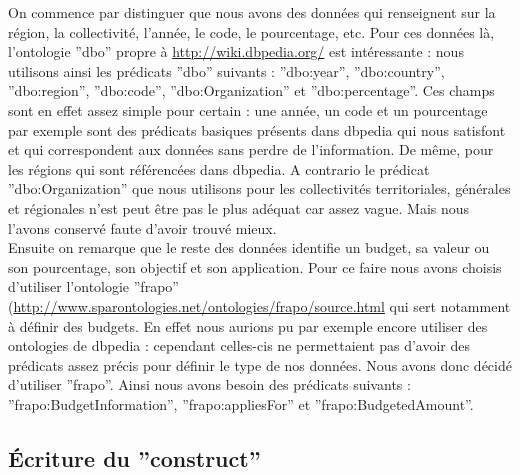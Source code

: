 \documentclass[a4paper,sffamily,12pt]{article}
\begin{document}
			\indent On commence par distinguer que nous avons des données qui renseignent sur la région, la collectivité, l'année, le code, le pourcentage, etc. Pour ces données là, l'ontologie ''dbo'' propre à \url{http://wiki.dbpedia.org/} est intéressante : nous utilisons ainsi les prédicats ''dbo'' suivants : ''dbo:year'', ''dbo:country'', ''dbo:region'', ''dbo:code'', ''dbo:Organization'' et ''dbo:percentage''. Ces champs sont en effet assez simple pour certain : une année, un code et un pourcentage par exemple sont des prédicats basiques présents dans dbpedia qui nous satisfont et qui correspondent aux données sans perdre de l'information. De même, pour les régions qui sont référencées dans dbpedia. A contrario le prédicat ''dbo:Organization'' que nous utilisons pour les collectivités territoriales, générales et régionales n'est peut être pas le plus adéquat car assez vague. Mais nous l'avons conservé faute d'avoir trouvé mieux.  \\ 
		
			\indent Ensuite on remarque que le reste des données identifie un budget, sa valeur ou son pourcentage, son objectif et son application. Pour ce faire nous avons choisis d'utiliser l'ontologie ''frapo'' (\url{http://www.sparontologies.net/ontologies/frapo/source.html} qui sert notamment à définir des budgets. En effet nous aurions pu par exemple encore utiliser des ontologies de dbpedia : cependant celles-cis ne permettaient pas d'avoir des prédicats assez précis pour définir le type de nos données.  Nous avons donc décidé d'utiliser ''frapo''. Ainsi nous avons besoin des prédicats suivants : ''frapo:BudgetInformation'', ''frapo:appliesFor'' et ''frapo:BudgetedAmount''.
		
			\vspace{0.5cm}
			
		\subsection{Écriture du ''construct''}
			
			\vspace{0.5cm}
		
\end{document}
